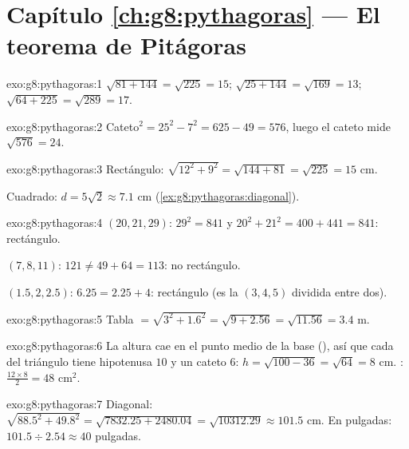 \section*{Capítulo \ref{ch:g8:pythagoras} --- El teorema de Pitágoras}

\begin{solution}{exo:g8:pythagoras:1}
$\sqrt{81 + 144} = \sqrt{225} = 15$; \quad
$\sqrt{25 + 144} = \sqrt{169} = 13$; \quad
$\sqrt{64 + 225} = \sqrt{289} = 17$.
\end{solution}

\begin{solution}{exo:g8:pythagoras:2}
Cateto$^2 = 25^2 - 7^2 = 625 - 49 = 576$, luego el cateto mide
$\sqrt{576} = 24$.
\end{solution}

\begin{solution}{exo:g8:pythagoras:3}
Rectángulo: $\sqrt{12^2 + 9^2} = \sqrt{144 + 81} = \sqrt{225} = 15$
cm.

Cuadrado: $d = 5\sqrt2 \approx 7.1$ cm
(\cref{ex:g8:pythagoras:diagonal}).
\end{solution}

\begin{solution}{exo:g8:pythagoras:4}
$(20, 21, 29)$: $29^2 = 841$ y $20^2 + 21^2 = 400 + 441 = 841$:
rectángulo.

$(7, 8, 11)$: $121 \neq 49 + 64 = 113$: no rectángulo.

$(1.5, 2, 2.5)$: $6.25 = 2.25 + 4$: rectángulo (es
la $(3,4,5)$ dividida entre dos).
\end{solution}

\begin{solution}{exo:g8:pythagoras:5}
Tabla $= \sqrt{3^2 + 1.6^2} = \sqrt{9 + 2.56} = \sqrt{11.56} = 3.4$
m.
\end{solution}

\begin{solution}{exo:g8:pythagoras:6}
La altura cae en el punto medio de la base (), así que
cada  del triángulo tiene hipotenusa $10$ y un cateto $6$:
$h = \sqrt{100 - 36} = \sqrt{64} = 8$ cm. :
$\frac{12 \times 8}{2} = 48$ cm$^2$.
\end{solution}

\begin{solution}{exo:g8:pythagoras:7}
Diagonal: $\sqrt{88.5^2 + 49.8^2} = \sqrt{7832.25 + 2480.04}
= \sqrt{10312.29} \approx 101.5$ cm. En pulgadas:
$101.5 \div 2.54 \approx 40$ pulgadas.
\end{solution}

